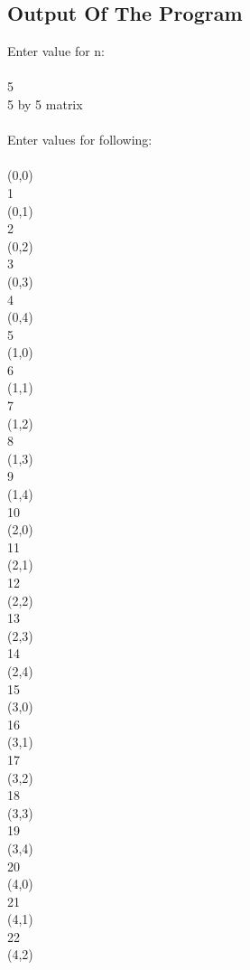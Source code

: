 \documentclass[paper=a4, fontsize=11pt]{scrartcl} %
\numberwithin{equation}{section} %
\numberwithin{figure}{section} %
\numberwithin{table}{section} %
\begin{document}
\subsection{Output Of The Program}
Enter value for n:\\
\\
5\\
5 by 5 matrix\\
\\
Enter values for following:\\
\\
(0,0)\\
1\\
(0,1)\\
2\\
(0,2)\\
3\\
(0,3)\\
4\\
(0,4)\\
5\\
(1,0)\\
6\\
(1,1)\\
7\\
(1,2)\\
8\\
(1,3)\\
9\\
(1,4)\\
10\\
(2,0)\\
11\\
(2,1)\\
12\\
(2,2)\\
13\\
(2,3)\\
14\\
(2,4)\\
15\\
(3,0)\\
16\\
(3,1)\\
17\\
(3,2)\\
18\\
(3,3)\\
19\\
(3,4)\\
20\\
(4,0)\\
21\\
(4,1)\\
22\\
(4,2)\\
\end{document}
